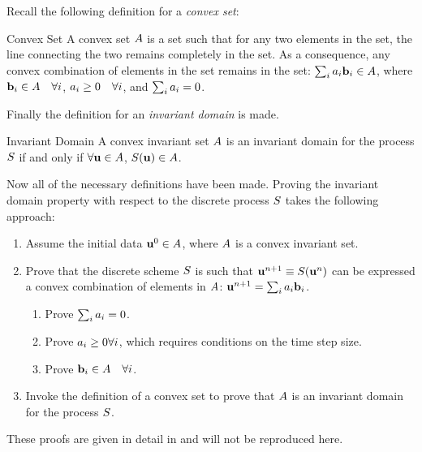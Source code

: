 Recall the following definition for a \emph{convex set}:
\begin{definition}{Convex Set}
A convex set $A$ is a set such that for any two elements in
the set, the line connecting the two remains completely in the set.
As a consequence, any convex combination of elements in the set remains in the
set: $\sum_ia_i\mathbf{b}_i\in A$, where
$\mathbf{b}_i\in A\quad\forall i$,
$a_i\geq 0\quad\forall i$, and $\sum_ia_i=0$.
\end{definition}
Finally the definition for an \emph{invariant domain} is made.
\begin{definition}{Invariant Domain}
A convex invariant set $A$ is an invariant domain for the
process $S$ if and only if
$\forall\mathbf{u}\in A$,
$S(\mathbf{u})\in A$.
\end{definition}
Now all of the necessary definitions have been made. Proving the invariant
domain property with respect to the discrete process $S$ takes
the following approach:
\begin{enumerate}
  \item Assume the initial data $\mathbf{u}^0\in A$, where
    $A$ is a convex invariant set.
  \item Prove that the discrete scheme $S$ is such that
    $\mathbf{u}^{n+1}\equiv S(\mathbf{u}^n)$
    can be expressed a convex combination of elements in $A$:
    $\mathbf{u}^{n+1}=\sum_ia_i\mathbf{b}_i$.
    \begin{enumerate}
      \item Prove $\sum_ia_i=0$.
      \item Prove $a_i\geq 0\forall i$, which requires
        conditions on the time step size.
      \item Prove $\mathbf{b}_i\in A\quad\forall i$.
    \end{enumerate}
  \item Invoke the definition of a convex set to prove that $A$
    is an invariant domain for the process $S$.
\end{enumerate}
These proofs are given in detail in \cite{guermond_invariantdomain} and
will not be reproduced here.

